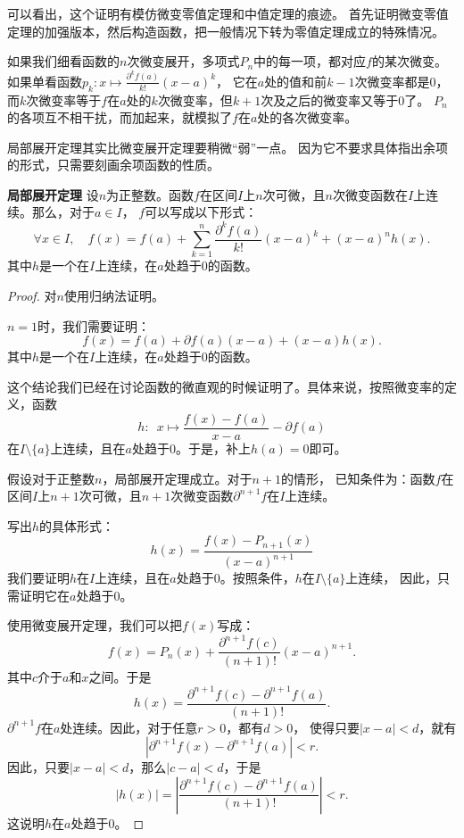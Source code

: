 \documentclass[12pt,UTF8]{ctexbook}
\begin{document}
\begin{appendix}
可以看出，这个证明有模仿微变零值定理和中值定理的痕迹。
首先证明微变零值定理的加强版本，然后构造函数，把一般情况下转为零值定理成立的特殊情况。

如果我们细看函数的$n$次微变展开，多项式$P_n$中的每一项，都对应$f$的某次微变。
如果单看函数$p_k: x\mapsto \frac{\partial^k f (a)}{k!}(x - a)^k$，
它在$a$处的值和前$k-1$次微变率都是$0$，而$k$次微变率等于$f$在$a$处的$k$次微变率，但$k+1$次及之后的微变率又等于$0$了。
$P_n$的各项互不相干扰，而加起来，就模拟了$f$在$a$处的各次微变率。

局部展开定理其实比微变展开定理要稍微“弱”一点。
因为它不要求具体指出余项的形式，只需要刻画余项函数的性质。

\begin{tm}{\textbf{局部展开定理}}
    设$n$为正整数。函数$f$在区间$I$上$n$次可微，且$n$次微变函数在$I$上连续。那么，对于$a\in I$，
    $f$可以写成以下形式：
    $$ \forall x \in I , \quad f(x) = f(a) + \sum_{k=1}^n \frac{\partial^k f (a)}{k!}(x - a)^k + (x - a)^n h(x). $$
    其中$h$是一个在$I$上连续，在$a$处趋于$0$的函数。
\end{tm}

\begin{proof}
    对$n$使用归纳法证明。

    $n=1$时，我们需要证明：
    $$ f(x) = f(a) + \partial f(a) (x - a) + (x - a) h(x). $$
    其中$h$是一个在$I$上连续，在$a$处趋于$0$的函数。
    
    这个结论我们已经在讨论函数的微直观的时候证明了。具体来说，按照微变率的定义，函数
    $$ h : \,\,\, x \mapsto \frac{f(x) - f(a)}{x - a} - \partial f(a) $$
    在$I\setminus\{a\}$上连续，且在$a$处趋于$0$。于是，补上$h(a) = 0$即可。

    假设对于正整数$n$，局部展开定理成立。对于$n+1$的情形，
    已知条件为：函数$f$在区间$I$上$n+1$次可微，且$n+1$次微变函数$\partial^{n+1} f$在$I$上连续。
    
    写出$h$的具体形式：
    $$ h(x) = \frac{f(x) - P_{n+1}(x)}{(x - a)^{n+1}} $$
    我们要证明$h$在$I$上连续，且在$a$处趋于$0$。按照条件，$h$在$I\setminus\{a\}$上连续，
    因此，只需证明它在$a$处趋于$0$。

    使用微变展开定理，我们可以把$f(x)$写成：
    $$ f(x) = P_n(x) + \frac{\partial^{n+1} f(c)}{(n + 1)!}(x - a)^{n+1}. $$
    其中$c$介于$a$和$x$之间。于是
    $$ h(x) = \frac{\partial^{n+1} f(c) - \partial^{n+1} f(a)}{(n + 1)!}. $$
    $\partial^{n+1} f$在$a$处连续。因此，对于任意$r>0$，都有$d > 0$，
    使得只要$|x - a| < d$，就有
    $$ \left| \partial^{n+1} f(x) - \partial^{n+1} f(a) \right| < r. $$
    因此，只要$|x - a| < d$，那么$|c - a| < d$，于是
    $$ |h(x)| = \left| \frac{\partial^{n+1} f(c) - \partial^{n+1} f(a)}{(n + 1)!} \right| < r .$$
    这说明$h$在$a$处趋于$0$。


\end{proof}
\end{appendix}
\end{document}
